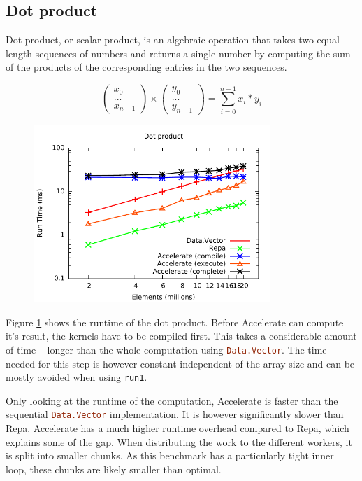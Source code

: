 \documentclass[a4paper,bibliography=totocnumbered,parskip,headsepline]{scrbook}
\begin{document}
\subsection{Dot product}
Dot product, or scalar product, is an algebraic operation that takes two equal-length sequences of numbers and returns a single number by computing the sum of the products of the corresponding entries in the two sequences.

\[
\begin{pmatrix}
x_0 \\ ... \\ x_{n-1}
\end{pmatrix}
\times
\begin{pmatrix}
y_0 \\ ... \\ y_{n-1}
\end{pmatrix}
= \displaystyle\sum_{i=0}^{n-1} x_i*y_i
\]

\begin{figure}
    \centering
    \includegraphics[width=0.8\textwidth]{images/benchmarks/dotp/dotp}
    \label{fig:dotp_bench}
\end{figure}

Figure \ref{fig:dotp_bench} shows the runtime of the dot product.
Before Accelerate can compute it's result, the kernels have to be compiled first.
This takes a considerable amount of time -- longer than the whole computation using \lstinline[language=haskell]{Data.Vector}.
The time needed for this step is however constant independent of the array size and can be mostly avoided when using \lstinline[language=haskell]{run1}.

Only looking at the runtime of the computation, Accelerate is faster than the sequential \lstinline[language=haskell]{Data.Vector} implementation.
It is however significantly slower than Repa.
Accelerate has a much higher runtime overhead compared to Repa, which explains some of the gap.
When distributing the work to the different workers, it is split into smaller chunks.
As this benchmark has a particularly tight inner loop, these chunks are likely smaller than optimal.
\end{document}
